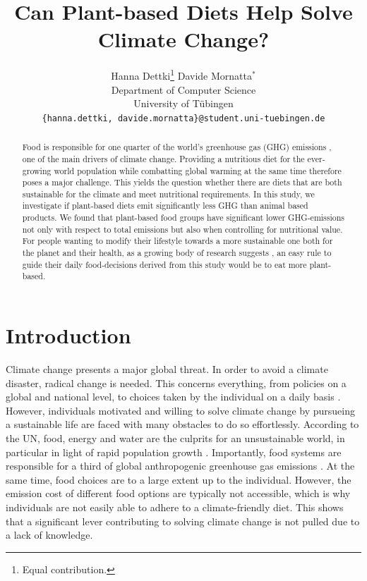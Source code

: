 \documentclass{article}
\title{Can Plant-based Diets Help Solve Climate Change?}
\author{%
  Hanna Dettki\thanks{Equal contribution.}\hspace{4em} Davide Mornatta$^{*}$  \\[0.5em]
  Department of Computer Science\\
  University of Tübingen\\
  \texttt{\{hanna.dettki, davide.mornatta\}@student.uni-tuebingen.de}
}
\begin{document}
\maketitle

\begin{abstract}
  Food is responsible for one quarter of the world's greenhouse gas (GHG) emissions \cite{Poore2018}, one of the main drivers of climate change. Providing a nutritious diet for the ever-growing world population while combatting global warming at the same time therefore poses a major challenge. This yields the question whether there are diets that are both sustainable for the climate and meet  nutritional requirements. In this study, we investigate if plant-based diets  emit significantly less GHG than animal based products. We found  that plant-based food groups have significant lower GHG-emissions not only with respect to total emissions but also when controlling for nutritional value. For people wanting to  modify their lifestyle towards a more sustainable one both for the planet and their health, as a growing body of research suggests \cite{WHO2021}, an easy rule to guide their daily food-decisions derived from this study would be to eat more plant-based.
\end{abstract}

\section{Introduction}

Climate change presents a major global threat. In order to avoid a climate disaster, radical change is needed. This concerns everything, from policies on a global and national level, to choices taken by the individual on a daily basis \cite{IPCC}. 
However, individuals motivated and willing to solve climate change by pursueing a sustainable life are faced with many obstacles to do so effortlessly. According to the UN, food, energy and water are the culprits for an unsustainable world, in particular in light of rapid population growth \cite{Ritchie2020}.
 Importantly, food systems are responsible for a third of global anthropogenic greenhouse gas emissions \cite{Crippa2021}. At the same time, food choices are to a large extent up to the individual.  However,  the emission cost of different food options are  typically not accessible, which is why individuals are  not easily able to adhere to  a climate-friendly diet. This shows that a significant lever contributing to solving climate change is not pulled due to a lack of knowledge.
\end{document}
